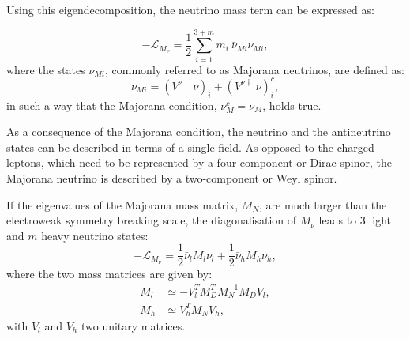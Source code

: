 Using this eigendecomposition, the neutrino mass term can be expressed as:

\begin{equation}
	-\mathcal{L}_{M_{\nu}} = \frac{1}{2} \sum_{i=1}^{3+m} m_{i}~\bar{\nu}_{M i} \nu_{M i},
\end{equation}
where the states $\nu_{M i}$, commonly referred to as Majorana neutrinos, are defined as:
\begin{equation}
	\nu_{M i} = \left(V^{\nu\dagger}~\nu\right)_{i} + \left(V^{\nu\dagger}~\nu\right)^{c}_{i},
\end{equation}
in such a way that the Majorana condition, $\nu^{c}_{M} = \nu_{M}$, holds true.

As a consequence of the Majorana condition, the neutrino and the antineutrino states can be described in terms of a single field. As opposed to the charged leptons, which need to be represented by a four-component or Dirac spinor, the Majorana neutrino is described by a two-component or Weyl spinor.

If the eigenvalues of the Majorana mass matrix, $M_{N}$, are much larger than the electroweak symmetry breaking scale, the diagonalisation of $M_{\nu}$ leads to $3$ light and $m$ heavy neutrino states:
\begin{equation}
	-\mathcal{L}_{M_{\nu}} = \frac{1}{2} \bar{\nu}_{l} M_{l} \nu_{l} + \frac{1}{2} \bar{\nu}_{h} M_{h} \nu_{h},
\end{equation}
where the two mass matrices are given by:
\begin{equation}
	\begin{split}
		M_{l} &\simeq -V_{l}^{T} M_{D}^{T} M_{N}^{-1} M_{D} V_{l},\\
		M_{h} &\simeq V_{h}^{T} M_{N} V_{h},
	\end{split}
\end{equation}
with $V_{l}$ and $V_{h}$ two unitary matrices.

